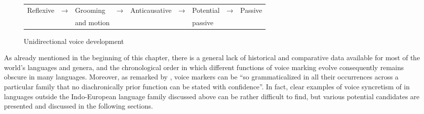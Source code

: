 \begin{figure}
	\caption{Unidirectional voice development \citep{haspelmath:2003}}
	\label{fig:ch7:unidirectional}
	\setlength{\tabcolsep}{2pt}
	\begin{tabularx}{0.88\textwidth}{lllllllll}
		Reflexive & → & Grooming\is{grooming} & → & Anticausative & → & Potential & → & Passive \\
		& & and motion & & & & passive & & \\
	\end{tabularx}
\end{figure}

As already mentioned in the beginning of this chapter, there is a general lack of historical and comparative data available for most of the world’s languages and genera, and the chronological order in which different functions of voice marking evolve consequently remains obscure in many languages. Moreover, as remarked by \citet[197]{kemmer:1993}, voice markers can be “so grammaticalized in all their occurrences across a particular family that no diachronically prior function can be stated with confidence”. In fact, clear examples of voice syncretism of  in languages outside the Indo-European language family discussed above can be rather difficult to find, but various potential candidates are presented and discussed in the following sections.

